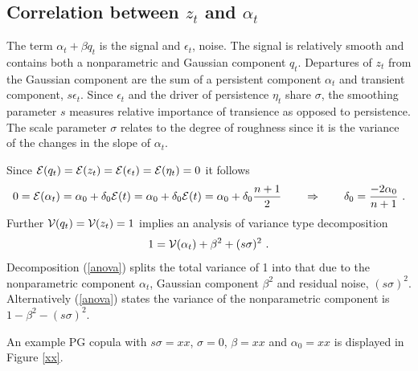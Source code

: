 \documentclass[authoryear]{elsarticle}
\newcommand{\cov}{\mathrm{cov}}
\newcommand{\eps}{\epsilon}
\newcommand{\Ex}{{\cal E}}
\newcommand{\eref}[1]{(\ref{#1})}
\newcommand{\fref}[1]{Figure \ref{#1}}
\newcommand{\cq}{\ , \qquad}
\newcommand{\Vx}{{\cal V}}
\newcommand{\be}[1]{\begin{equation}\label{#1}}
\newcommand{\ee}{\end{equation}}
\begin{document}
\subsection{Correlation between $z_t$ and $\alpha_t$}


 
 
 
 
 The term $\alpha_t+\beta q_t$ is the signal and $\eps_t$, noise.    The signal is relatively smooth and contains both a nonparametric and Gaussian component $q_t$.   Departures of $z_t$ from the Gaussian component  are the sum of a persistent component $\alpha_t$ and  transient component, $s\eps_t$.  Since  $\eps_t$ and  the driver of persistence $\eta_t$  share $\sigma$, the smoothing parameter $s$ measures relative importance of transience as opposed to persistence.   The scale parameter $\sigma$ relates to the degree of roughness since it is the variance of the changes in the  slope of $\alpha_t$.
 

 
  Since $\Ex(q_t)=\Ex(z_t)=\Ex(\eps_t)=\Ex(\eta_t)=0$ it follows  
 $$
0= \Ex(\alpha_t)=\alpha_0+\delta_0 \Ex(t) = \alpha_0+\delta_0 \Ex(t) = \alpha_0+\delta_0 \frac{n+1}{2}\qquad\Rightarrow\qquad \delta_0 = \frac{-2\alpha_0}{n+1}\ .
 $$ 
Further $\Vx(q_t)=\Vx(z_t)=1$ implies an analysis of variance type decomposition
\be{anova}
 1= \Vx(\alpha_t) + \beta^2 + (s\sigma)^2\ .
\ee
Decomposition \eref{anova} splits the total variance  of 1 into that due to the nonparametric component $\alpha_t$,  Gaussian component $\beta^2$ and residual noise, $(s\sigma)^2$.  Alternatively \eref{anova} states the variance of the nonparametric component is $1-\beta^2-(s\sigma)^2$.

An example PG copula with $s\sigma=xx$, $\sigma=0$, $\beta=xx$ and $\alpha_0=xx$  is displayed in \fref{xx}.  

 
 
\end{document}
